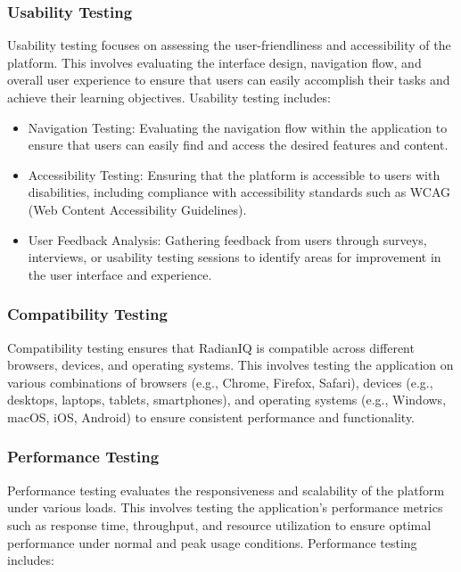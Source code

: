 		\subsubsection{Usability Testing}
		
		Usability testing focuses on assessing the user-friendliness and accessibility of the platform. This involves evaluating the interface design, navigation flow, and overall user experience to ensure that users can easily accomplish their tasks and achieve their learning objectives. Usability testing includes:
		
		\begin{itemize}
			\item Navigation Testing: Evaluating the navigation flow within the application to ensure that users can easily find and access the desired features and content.
			\item Accessibility Testing: Ensuring that the platform is accessible to users with disabilities, including compliance with accessibility standards such as WCAG (Web Content Accessibility Guidelines).
			\item User Feedback Analysis: Gathering feedback from users through surveys, interviews, or usability testing sessions to identify areas for improvement in the user interface and experience.
		\end{itemize}
		
		\subsubsection{Compatibility Testing}
		
		Compatibility testing ensures that RadianIQ is compatible across different browsers, devices, and operating systems. This involves testing the application on various combinations of browsers (e.g., Chrome, Firefox, Safari), devices (e.g., desktops, laptops, tablets, smartphones), and operating systems (e.g., Windows, macOS, iOS, Android) to ensure consistent performance and functionality.
		
		\subsubsection{Performance Testing}
		
		Performance testing evaluates the responsiveness and scalability of the platform under various loads. This involves testing the application's performance metrics such as response time, throughput, and resource utilization to ensure optimal performance under normal and peak usage conditions. Performance testing includes:
		

